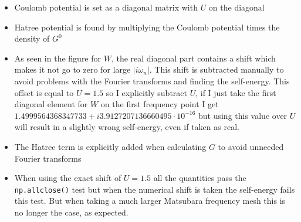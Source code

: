 \documentclass[12pt]{article}
\begin{document}
\begin{itemize}
	\item Coulomb potential is set as a diagonal matrix with $U$ on the diagonal
	\item Hatree potential is found by multiplying the Coulomb potential times the density of $G^0$
	\item As seen in the figure for $W$, the real diagonal part contains a shift which makes it not go to zero for large $|i\omega_n|$. This shift is subtracted manually to avoid problems with the Fourier transforms and finding the self-energy. This offset is equal to $U=1.5$ so I explicitly subtract $U$, if I just take the first diagonal element for $W$ on the first frequency point I get $1.4999564368347733+i3.9127207136660495\cdot 10^{-16}$ but using this value over $U$ will result in a slightly wrong self-energy, even if taken as real.
	\item The Hatree term is explicitly added when calculating $G$ to avoid unneeded Fourier transforms
	\item When using the exact shift of $U=1.5$ all the quantities pass the \texttt{np.allclose()} test but when the numerical shift is taken the self-energy fails this test. But when taking a much larger Matsubara frequency mesh this is no longer the case, as expected.
\end{itemize}
\end{document}
